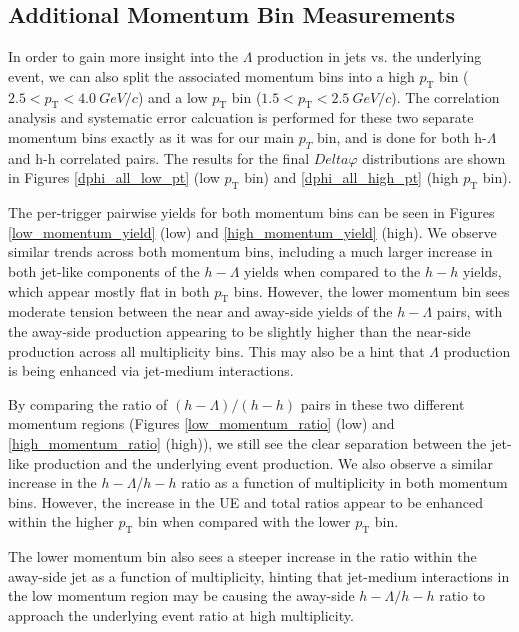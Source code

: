 \documentclass[ALICE,manyauthors]{ALICE_analysis_notes}
\begin{document}
\subsection{Additional Momentum Bin Measurements}
In order to gain more insight into the $\Lambda$ production in jets vs. the underlying event, we can also split the associated momentum bins into a high $p_{\text{T}}$ bin ($2.5 < p_{\text{T}} < \SI{4.0}{GeV/c}$) and a low $p_{\text{T}}$ bin ($1.5 < p_{\text{T}} < \SI{2.5}{GeV/c}$).  The correlation analysis and systematic error calcuation is performed for these two separate momentum bins exactly as it was for our main $p_{T}$ bin, and is done for both h-$\Lambda$ and h-h correlated pairs. The results for the final $Delta\varphi$ distributions are shown in Figures \ref{dphi_all_low_pt} (low $p_{\text{T}}$ bin) and \ref{dphi_all_high_pt} (high $p_{\text{T}}$ bin).

The per-trigger pairwise yields for both momentum bins can be seen in Figures \ref{low_momentum_yield} (low) and \ref{high_momentum_yield} (high). We observe similar trends across both momentum bins, including a much larger increase in both jet-like components of the $h-\Lambda$ yields when compared to the $h-h$ yields, which appear mostly flat in both $p_\text{T}$ bins. However, the lower momentum bin sees moderate tension between the near and away-side yields of the $h-\Lambda$ pairs, with the away-side production appearing to be slightly higher than the near-side production across all multiplicity bins. This may also be a hint that $\Lambda$ production is being enhanced via jet-medium interactions.

By comparing the ratio of $(h-\Lambda)/(h-h)$ pairs in these two different momentum regions (Figures \ref{low_momentum_ratio} (low) and \ref{high_momentum_ratio} (high)), we still see the clear separation between the jet-like production and the underlying event production. We also observe a similar increase in the $h-\Lambda$/$h-h$ ratio as a function of multiplicity in both momentum bins. However, the increase in the UE and total ratios appear to be enhanced within the higher $p_{\text{T}}$ bin when compared with the lower $p_{\text{T}}$ bin.

 The lower momentum bin also sees a steeper increase in the ratio within the away-side jet as a function of multiplicity, hinting that jet-medium interactions in the low momentum region may be causing the away-side $h-\Lambda/h-h$ ratio to approach the underlying event ratio at high multiplicity.
\end{document}
